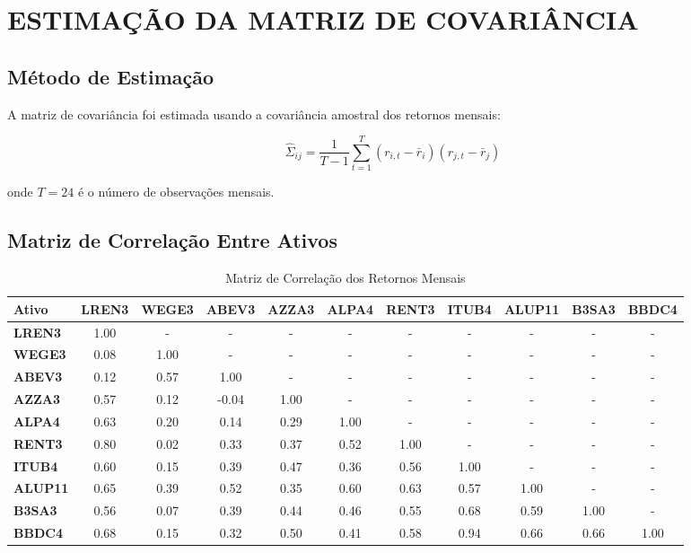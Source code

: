 \section{ESTIMAÇÃO DA MATRIZ DE COVARIÂNCIA}

\subsection{Método de Estimação}

A matriz de covariância foi estimada usando a covariância amostral dos retornos mensais:

\begin{equation}
\hat{\Sigma}_{ij} = \frac{1}{T-1} \sum_{t=1}^{T} (r_{i,t} - \bar{r}_i)(r_{j,t} - \bar{r}_j)
\end{equation}

onde $T = 24$ é o número de observações mensais.

\subsection{Matriz de Correlação Entre Ativos}

\begin{table}[H]
\centering
\caption{Matriz de Correlação dos Retornos Mensais}
\scriptsize
\begin{tabular}{|l|c|c|c|c|c|c|c|c|c|c|}
\hline
\textbf{Ativo} & \textbf{LREN3} & \textbf{WEGE3} & \textbf{ABEV3} & \textbf{AZZA3} & \textbf{ALPA4} & \textbf{RENT3} & \textbf{ITUB4} & \textbf{ALUP11} & \textbf{B3SA3} & \textbf{BBDC4} \\
\hline
\textbf{LREN3} & 1.00 & - & - & - & - & - & - & - & - & - \\
\textbf{WEGE3} & 0.08 & 1.00 & - & - & - & - & - & - & - & - \\
\textbf{ABEV3} & 0.12 & 0.57 & 1.00 & - & - & - & - & - & - & - \\
\textbf{AZZA3} & 0.57 & 0.12 & -0.04 & 1.00 & - & - & - & - & - & - \\
\textbf{ALPA4} & 0.63 & 0.20 & 0.14 & 0.29 & 1.00 & - & - & - & - & - \\
\textbf{RENT3} & 0.80 & 0.02 & 0.33 & 0.37 & 0.52 & 1.00 & - & - & - & - \\
\textbf{ITUB4} & 0.60 & 0.15 & 0.39 & 0.47 & 0.36 & 0.56 & 1.00 & - & - & - \\
\textbf{ALUP11} & 0.65 & 0.39 & 0.52 & 0.35 & 0.60 & 0.63 & 0.57 & 1.00 & - & - \\
\textbf{B3SA3} & 0.56 & 0.07 & 0.39 & 0.44 & 0.46 & 0.55 & 0.68 & 0.59 & 1.00 & - \\
\textbf{BBDC4} & 0.68 & 0.15 & 0.32 & 0.50 & 0.41 & 0.58 & 0.94 & 0.66 & 0.66 & 1.00 \\
\hline
\end{tabular}
\end{table}

